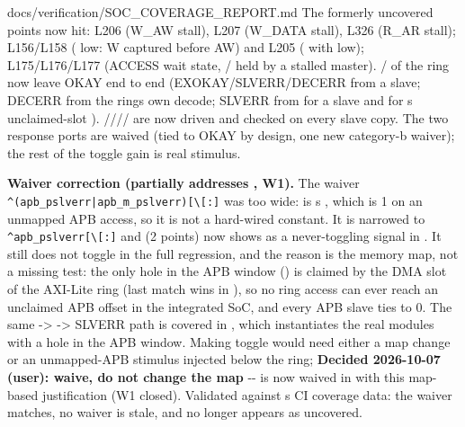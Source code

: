 \begin{relocated}{docs/verification/SOC_COVERAGE_REPORT.md}
The formerly uncovered points now hit:  L206
(W\_AW stall), L207 (W\_DATA stall), L326 (R\_AR stall);
 L156/L158 ( low: W captured
before AW) and L205 ( with  low);
 L175/\allowbreak{}L176/\allowbreak{}L177 (ACCESS wait
state, / held by a stalled master).
/ of the ring now leave OKAY end to end
(EXOKAY/\allowbreak{}SLVERR/\allowbreak{}DECERR from a slave; DECERR
from the ring\textquotesingle s own decode; SLVERR from
 for a slave  and for
\textquotesingle s unclaimed-slot
). 
////
are now driven and checked on every slave copy. The two
 response ports are waived (tied to OKAY by
design, one new category-b waiver); the rest of the toggle gain is real
stimulus.

\textbf{Waiver correction (partially addresses , W1).} The
 waiver
\texttt{\textasciicircum{}(apb\_\allowbreak{}pslverr|apb\_\allowbreak{}m\_\allowbreak{}pslverr)[\textbackslash{}[:\allowbreak{}]}
was too wide:  is
\textquotesingle s , which is 1
on an unmapped APB access, so it is not a hard-wired constant. It is
narrowed to
\texttt{\textasciicircum{}apb\_\allowbreak{}pslverr[\textbackslash{}[:\allowbreak{}]}
and  (2 points) now shows as a never-toggling signal
in . It still does not toggle in the full regression, and
the reason is the memory map, not a missing test: the only hole in the
APB window () is claimed by the DMA slot
of the AXI-Lite ring (last match wins in ),
so no ring access can ever reach an unclaimed APB offset in the
integrated SoC, and every APB slave ties  to 0. The same
 -\textgreater{} 
-\textgreater{} SLVERR path is covered in , which
instantiates the real modules with a hole in the APB window. Making
 toggle would need either a map change or an
unmapped-APB stimulus injected below the ring; \textbf{Decided
2026-10-07 (user): waive, do not change the map} -\/-
 is now waived in  with this map-based
justification (W1 closed). Validated against \textquotesingle s
CI coverage data: the waiver matches, no waiver is stale, and
 no longer appears as uncovered.


\end{relocated}
